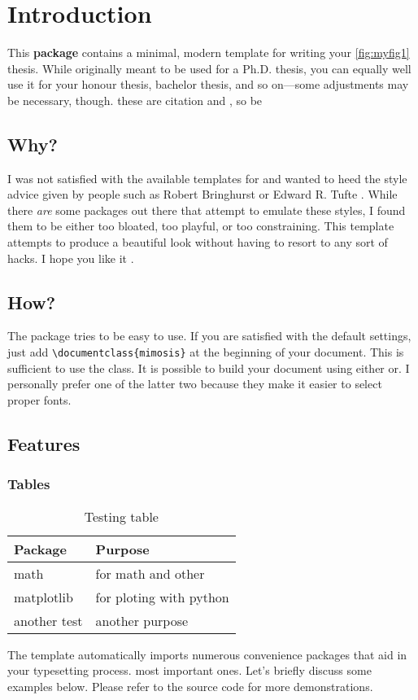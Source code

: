 \documentclass{mimosis}
\numberwithin{equation}{chapter}
\numberwithin{listing}{chapter}
\begin{document}
\chapter{Introduction}
\label{sec:org1cf719d}
This \textbf{package} contains a minimal, modern template for writing your \autoref{fig:myfig1}
thesis. While originally meant to be used for a Ph.D. thesis, you can
equally well use it for your honour thesis, bachelor thesis, and so
on---some adjustments may be necessary, though.
these are citation \cite{Laramee11,Laramee10} and \cite{Edelsbrunner02}, \cite{Edelsbrunner10}
so be \autocite{Tufte01}
\section{Why?}
\label{sec:org1665969}
I was not satisfied with the available templates for and wanted
to heed the style advice given by people such as Robert Bringhurst \cite{Bringhurst12} or Edward R.
Tufte \cite{Tufte90,Tufte01} . While there \emph{are} some packages out 
there that attempt to emulate these styles, I found them to be either
too bloated, too playful, or too constraining. This template attempts to
produce a beautiful look without having to resort to any sort of hacks.
I hope you like it \cite{nikouei19:_i_safe}.

\section{How?}
\label{sec:orgc5c1d69}
The package tries to be easy to use. If you are satisfied with the
default settings, just add \texttt{\textbackslash{}documentclass\{mimosis\}} at the beginning of your document.
This is sufficient to use the class.
It is possible to build your document using either  or. I personally prefer one of the latter two because they make
it easier to select proper fonts.
\section{Features}
\label{sec:org966169b}
\subsection{Tables}
\label{sec:orgb67753c}

\begin{table}[htbp]
\caption{\label{table1}Testing table}
\centering
\begin{tabular}{ll}
\toprule
\textbf{Package} & \textbf{Purpose}\\
\midrule
math & for math and other\\
matplotlib & for ploting with python\\
another test & another purpose\\
\bottomrule
\end{tabular}
\end{table}
The template automatically imports numerous convenience packages that
aid in your typesetting process.
most important ones. Let's briefly discuss some examples below. Please
refer to the source code for more demonstrations.
\end{document}
